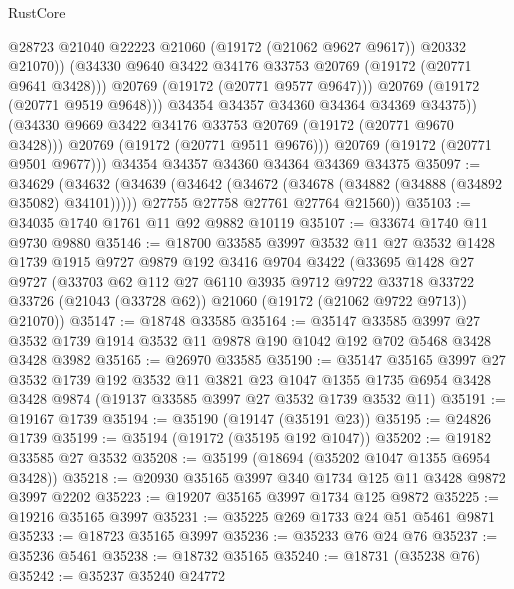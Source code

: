 \begin{lexlean}{RustCore}
\begin{coremodule}
                    @28723
                    @21040
                    @22223
                    @21060
                    (@19172 (@21062 @9627 @9617))
                    @20332
                    @21070))
                (@34330 @9640 @3422 @34176 @33753 @20769 (@19172 (@20771 @9641 @3428)))
                @20769
                (@19172 (@20771 @9577 @9647)))
              @20769
              (@19172 (@20771 @9519 @9648)))
            @34354
            @34357
            @34360
            @34364
            @34369
            @34375))
        (@34330 @9669 @3422 @34176 @33753 @20769 (@19172 (@20771 @9670 @3428)))
        @20769
        (@19172 (@20771 @9511 @9676)))
      @20769
      (@19172 (@20771 @9501 @9677)))
    @34354
    @34357
    @34360
    @34364
    @34369
    @34375
@35097 := @34629
    (@34632
      (@34639
        (@34642 (@34672 (@34678 (@34882 (@34888 (@34892 @35082) @34101)))))
        @27755
        @27758
        @27761
        @27764
        @21560))
@35103 := @34035 @1740 @1761 @11 @92 @9882 @10119
@35107 := @33674 @1740 @11 @9730 @9880
@35146 := @18700
    @33585
    @3997
    @3532
    @11
    @27
    @3532
    @1428
    @1739
    @1915
    @9727
    @9879
    @192
    @3416
    @9704
    @3422
    (@33695
      @1428
      @27
      @9727
      (@33703
        @62
        @112
        @27
        @6110
        @3935
        @9712
        @9722
        @33718
        @33722
        @33726
        (@21043 (@33728 @62))
        @21060
        (@19172 (@21062 @9722 @9713))
        @21070))
@35147 := @18748 @33585
@35164 := @35147
    @33585
    @3997
    @27
    @3532
    @1739
    @1914
    @3532
    @11
    @9878
    @190
    @1042
    @192
    @702
    @5468
    @3428
    @3428
    @3982
@35165 := @26970 @33585
@35190 := @35147
    @35165
    @3997
    @27
    @3532
    @1739
    @192
    @3532
    @11
    @3821
    @23
    @1047
    @1355
    @1735
    @6954
    @3428
    @3428
    @9874
    (@19137 @33585 @3997 @27 @3532 @1739 @3532 @11)
@35191 := @19167 @1739
@35194 := @35190 (@19147 (@35191 @23))
@35195 := @24826 @1739
@35199 := @35194 (@19172 (@35195 @192 @1047))
@35202 := @19182 @33585 @27 @3532
@35208 := @35199 (@18694 (@35202 @1047 @1355 @6954 @3428))
@35218 := @20930 @35165 @3997 @340 @1734 @125 @11 @3428 @9872 @3997 @2202
@35223 := @19207 @35165 @3997 @1734 @125 @9872
@35225 := @19216 @35165 @3997
@35231 := @35225 @269 @1733 @24 @51 @5461 @9871
@35233 := @18723 @35165 @3997
@35236 := @35233 @76 @24 @76
@35237 := @35236 @5461
@35238 := @18732 @35165
@35240 := @18731 (@35238 @76)
@35242 := @35237 @35240 @24772

\end{coremodule}
\end{lexlean}
